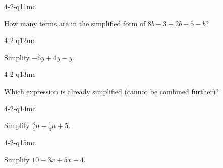 \begin{practiceQuestion}{4-2-q11}{mc}
\begin{questionText}
How many terms are in the simplified form of $8b - 3 + 2b + 5 - b$?
\end{questionText}
\end{practiceQuestion}

\begin{practiceQuestion}{4-2-q12}{mc}
\begin{questionText}
Simplify $-6y + 4y - y$.
\end{questionText}
\end{practiceQuestion}

\begin{practiceQuestion}{4-2-q13}{mc}
\begin{questionText}
Which expression is already simplified (cannot be combined further)?
\end{questionText}
\end{practiceQuestion}

\begin{practiceQuestion}{4-2-q14}{mc}
\begin{questionText}
Simplify $\frac{3}{4}n - \frac{1}{4}n + 5$.
\end{questionText}
\end{practiceQuestion}

\begin{practiceQuestion}{4-2-q15}{mc}
\begin{questionText}
Simplify $10 - 3x + 5x - 4$.
\end{questionText}
\end{practiceQuestion}


